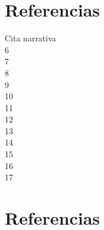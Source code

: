 \documentclass{article}
\begin{document}
\setcounter{page}{1}
\section{Referencias}
Cita narrativa \cite{SNarrativa} \\
6 \cite{EF-2} \\
7 \cite{EF-7} \\
8 \cite{EF-9} \\
9 \cite{EF-11} \\
10 \cite{EF-10} \\
11 \cite{EF-19} \\
12 \cite{EF-4} \\
13 \cite{EF-20} \\
14 \cite{EF-2} \\
15 \cite{EF-1} \\
16 \cite{EF-17} \\
17 \cite{Cronograma} \\


\section{Referencias}
\printbibliography
\end{document}
